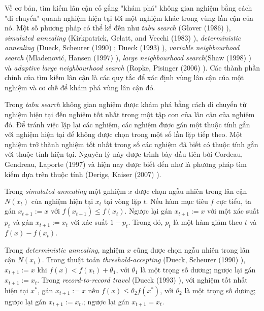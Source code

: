 Về cơ bản, tìm kiếm lân cận cố gắng "khám phá" không gian nghiệm bằng cách "di chuyển" quanh nghiệm hiện tại tới một nghiệm khác trong vùng lần cận của nó. Một số phương pháp có thể kể đến như \textit{tabu search} (Glover (1986) \cite{glover1986future}), \textit{simulated annealing} (Kirkpatrick, Gelatt, and Vecchi
(1983) \cite{kirkpatrick1983optimization}), \textit{deterministic annealing} (Dueck, Scheurer
(1990) \cite{dueck1990threshold}; Dueck (1993) \cite{dueck1993new}), \textit{variable neighbourhood search} (Mladenović, Hansen (1997) \cite{mladenovic1997variable}), \textit{large neighbourhood search}(Shaw (1998) \cite{shaw1998using}) và \textit{adaptive large neighbourhood search} (Ropke, Pisinger (2006) \cite{ropke2006adaptive}). Các thành phần chính của tìm kiếm lân cận là các quy tắc để xác định vùng lân cận của một nghiệm và cơ chế để khám phá vùng lân cận đó.

Trong \textit{tabu search} không gian nghiệm được khám phá bằng cách di chuyển từ nghiệm hiện tại đến nghiệm tốt nhất trong một tập con của lân cận của nghiệm đó. Để tránh việc lặp lại các nghiệm, các nghiệm được gán một thuộc tính gắn với nghiệm hiện tại để không được chọn trong một số lần lặp tiếp theo. Một nghiệm trở thành nghiệm tốt nhất trong số các nghiệm đã biết có thuộc tính gắn với thuộc tính hiện tại. Nguyên lý này được trình bày đầu tiên bởi Cordeau, Gendreau, Laporte (1997) \cite{cordeau1997tabu} và hiện nay được biết đến như là phương pháp tìm kiếm dựa trên thuộc tính (Derigs, Kaiser (2007) \cite{derigs2007applying}).

Trong \textit{simulated annealing} một gnhiệm $x$ được chọn ngẫu nhiên trong lân cận $N(x_t)$ của nghiệm hiện tại $x_t$ tại vòng lặp $t$. Nếu hàm mục tiêu $f$ cực tiểu, ta gán $x_{t+1}:=x$ với $f(x_{t+1}) \leq f(x_t)$. Ngược lại gán $x_{t+1}:=x$ với một xác suất $p_t$ và gán $x_{t+1}:=x_t$ với xác suất $1-p_t$. Trong đó, $p_t$ là một hàm giảm theo $t$ và $f(x) - f(x_t)$.

Trong \textit{deterministic annealing}, nghiệm $x$ cũng được chọn ngẫu nhiên trong lân cận $N(x_t)$. Trong thuật toán \textit{threshold-accepting} (Dueck, Scheurer (1990) \cite{dueck1990threshold}), $x_{t+1}:=x$ khi $f(x) < f(x_t) + \theta_1$, với $\theta_1$ là một trọng số dương; ngược lại gán $x_{t+1}:=x_t$. Trong \textit{record-to-record travel} (Dueck (1993) \cite{dueck1993new}), với nghiệm tốt nhất hiện tại $x^*$, gán $x_{t+1}:=x$ nếu $f(x) \leq \theta_2 f(x^*)$, với $\theta_2$ là một trọng số dương; ngược lại gán $x_{t+1}:=x_t$.; ngược lại gán $x_{t+1}=x_t$.

